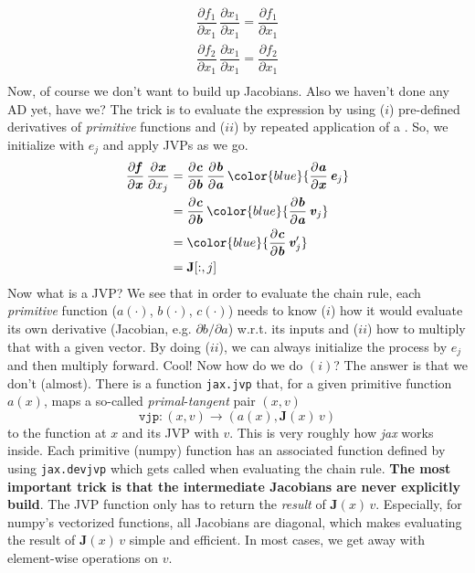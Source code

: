 \documentclass[paper=a4,11pt,headsepline]{scrartcl}
\newcommand{\ve}[1]{\ensuremath{\bm{\mathit{#1}}}}
\newcommand{\ma}[1]{\ensuremath{\bm{\mathbf{#1}}}}
\newcommand{\ra}{\ensuremath{\rightarrow}}
\newcommand{\pd}[2]{\dfrac{\partial #1}{\partial #2}}
\newcommand{\pdi}[2]{\partial #1/\partial #2}
\newcommand{\blue}[1]{{\color{blue}{#1}}}
\begin{document}
\begin{gather*}
    \pd{f_1}{x_1}\,\pd{x_1}{x_1} = \pd{f_1}{x_1} \\
    \pd{f_2}{x_1}\,\pd{x_1}{x_1} = \pd{f_2}{x_1} \\
\end{gather*}
Now, of course we don't want to build up Jacobians. Also we haven't done any AD
yet, have we? The trick is to evaluate the expression by using ($i$)
pre-defined derivatives of \emph{primitive} functions and ($ii$) by repeated
application of a \blue{\emph{Jacobian vector product (JVP)}}. So, we initialize
with $\ve e_j$ and apply JVPs as we go.
\begin{align*}
    \pd{\ve f}{\ve x}\,\pd{\ve x}{x_j}
        &= \pd{\ve c}{\ve b}\,\pd{\ve b}{\ve a}\,\blue{\pd{\ve a}{\ve x}\,\ve e_j} \\
        &= \pd{\ve c}{\ve b}\,\blue{\pd{\ve b}{\ve a}\,\ve v_j} \\
        &= \blue{\pd{\ve c}{\ve b}\,\ve v_j'} \\
        &= \ma J[:,j]
\end{align*}
Now what is a JVP? We see that in order to evaluate the chain rule, each
\emph{primitive} function ($\ve a(\cdot)$, $\ve b(\cdot)$, $\ve c(\cdot)$)
needs to know ($i$) how it would evaluate its own derivative (Jacobian, e.g.
$\pdi{\ve b}{\ve a}$) w.r.t. its inputs and ($ii$) how to multiply that with a
given vector. By doing ($ii$), we can always initialize the process by $\ve
e_j$ and then multiply forward. Cool! Now how do we do $(i)$? The answer is
that we don't (almost). There is a function \texttt{jax.jvp} that, for a given
primitive function $\ve a(\ve x)$, maps a so-called
\emph{primal}-\emph{tangent} pair $(\ve x, \ve v)$
\begin{equation*}
    \texttt{vjp}: (\ve x, \ve v) \ra \left(\ve a(\ve x), \ma J(\ve x)\,\ve v\right)
\end{equation*}
to the function at $\ve x$ and its JVP with $\ve v$. This is very roughly how
\textsl{jax} works inside. Each primitive (numpy) function has an associated
function defined by using \texttt{jax.devjvp} which gets called when evaluating
the chain rule. \textbf{The most important trick is that the intermediate
Jacobians are never explicitly build}. The JVP function only has to return the
\emph{result} of $\ma J(\ve x)\,\ve v$. Especially, for numpy's vectorized
functions, all Jacobians are diagonal, which makes evaluating the result of $\ma J(\ve x)\,\ve v$
simple and efficient. In most cases, we get away with element-wise operations
on \ve v.
\end{document}
